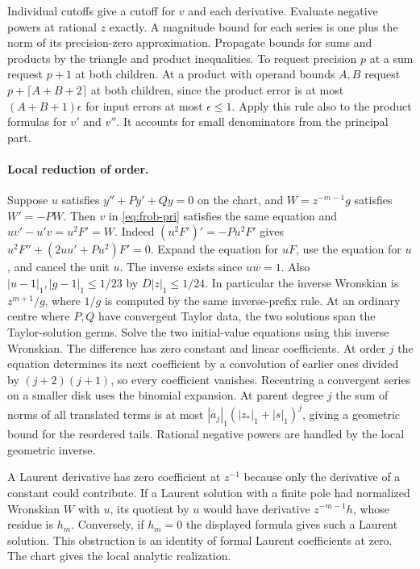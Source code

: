Individual cutoffs give a cutoff for $v$ and each derivative. Evaluate
negative powers at rational $z$ exactly. A magnitude bound for each series
is one plus the norm of its precision-zero approximation. Propagate bounds
for sums and products by the triangle and product inequalities. To request
precision $p$ at a sum request $p+1$ at both children. At a product with
operand bounds $A,B$ request $p+\lceil A+B+2\rceil$ at both children,
since the product error is at most $(A+B+1)\epsilon$ for input
errors at most $\epsilon\le1$. Apply this rule also to the product
formulas for $v'$ and $v''$. It accounts for small denominators from the
principal part.

\paragraph{Local reduction of order.}
Suppose $u$ satisfies $y''+P y'+Qy=0$ on the chart, and
$W=z^{-m-1}g$ satisfies $W'=-PW$. Then $v$ in
\eqref{eq:frob-pri} satisfies the same equation and
$uv'-u'v=u^2F'=W$. Indeed $(u^2F')'=-Pu^2F'$ gives
$u^2F''+(2uu'+Pu^2)F'=0$. Expand the equation for $uF$, use the
equation for $u$, and cancel the unit $u$. The inverse exists since $uw=1$.
Also $|u-1|_1,|g-1|_1\le1/23$ by $D|z|_1\le1/24$.
In particular the inverse Wronskian is $z^{m+1}/g$, where $1/g$ is
computed by the same inverse-prefix rule. At an ordinary centre where
$P,Q$ have convergent Taylor data, the two solutions span the Taylor-solution
germs. Solve the two initial-value equations using this inverse Wronskian.
The difference has zero constant and linear coefficients. At order $j$ the
equation determines its next coefficient by a convolution of earlier ones
divided by $(j+2)(j+1)$, so every coefficient vanishes. Recentring a convergent
series on a smaller disk uses the binomial expansion. At parent degree $j$
the sum of norms of all translated terms is at most
$|a_j|_1(|z_*|_1+|s|_1)^j$, giving a geometric bound for the reordered
tails. Rational negative powers are handled by the local geometric inverse.

A Laurent derivative has zero coefficient at $z^{-1}$ because only the
derivative of a constant could contribute. If a Laurent solution with
a finite pole had normalized Wronskian $W$ with $u$, its quotient by $u$
would have derivative $z^{-m-1}h$, whose residue is $h_m$. Conversely,
if $h_m=0$ the displayed formula gives such a Laurent solution. This
obstruction is an identity of formal Laurent coefficients at zero.
The chart gives the local analytic realization.

